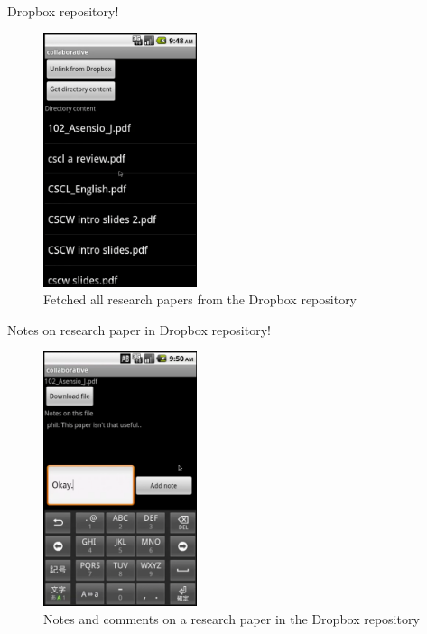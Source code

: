 Dropbox repository!
\begin{figure}[h!]
\centering
\includegraphics[width=0.4\textwidth]{images/chap7_dropbox1.png}
\caption{Fetched all research papers from the Dropbox repository}
\label{fig:coll_dropbox1}
\end{figure}
Notes on research paper in Dropbox repository!
\begin{figure}[h!]
\centering
\includegraphics[width=0.4\textwidth]{images/chap7_dropbox2.png}
\caption{Notes and comments on a research paper in the Dropbox repository}
\label{fig:coll_dropbox2}
\end{figure}
